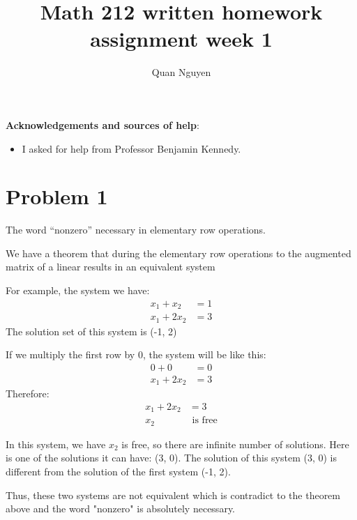 \documentclass[10pt]{article}
\begin{document}
\title{Math 212 written homework assignment week 1}
\author{Quan Nguyen}
\maketitle

\bigskip
\noindent
{\bf Acknowledgements and sources of help}:
\begin{itemize}
    \item I asked for help from Professor Benjamin Kennedy.
\end{itemize}

\bigskip
\noindent

\section*{Problem 1}

\noindent The word “nonzero” necessary in elementary row operations.

\noindent We have a theorem that during the elementary row operations to the augmented matrix of a linear results in an equivalent system

\noindent For example, the system we have:
\begin{align*}
    x_1 + x_2 &= 1 \\
    x_1 + 2x_2 &= 3
\end{align*}
\noindent The solution set of this system is (-1, 2)

\noindent If we multiply the first row by $0$, the system will be like this:
\begin{align*}
    0 + 0 &= 0 \\
    x_1 + 2x_2 &= 3
\end{align*}
\noindent Therefore:
\begin{align*}
    x_1 + 2x_2 &= 3 \\
    x_2 &\text{ is free}
\end{align*}

\noindent In this system, we have $x_2$ is free, so there are infinite number of solutions. Here is one of the solutions it can have: (3, 0). The solution of this system (3, 0) is different from the solution of the first system (-1, 2).


\noindent Thus, these two systems are not equivalent which is contradict to the theorem above and the word "nonzero" is absolutely necessary.
\end{document}
